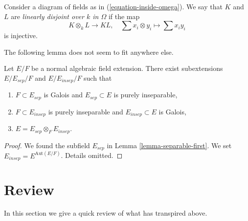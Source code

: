 \begin{definition}
\label{definition-linearly-disjoint}
Consider a diagram of fields as in (\ref{equation-inside-omega}).
We say that $K$ and $L$ are {\it linearly disjoint over $k$ in $\Omega$}
if the map
$$
K \otimes_k L \longrightarrow KL,\quad
\sum x_i \otimes y_i \longmapsto \sum x_i y_i
$$
is injective.
\end{definition}

\noindent
The following lemma does not seem to fit anywhere else.

\begin{lemma}
\label{lemma-normal-case}
Let $E/F$ be a normal algebraic field extension. There exist subextensions
$E / E_{sep} /F$ and $E / E_{insep} / F$ such that
\begin{enumerate}
\item $F \subset E_{sep}$ is Galois and $E_{sep} \subset E$
is purely inseparable,
\item $F \subset E_{insep}$ is purely inseparable and $E_{insep} \subset E$
is Galois,
\item $E = E_{sep} \otimes_F E_{insep}$.
\end{enumerate}
\end{lemma}

\begin{proof}
We found the subfield $E_{sep}$ in Lemma \ref{lemma-separable-first}.
We set $E_{insep} = E^{\text{Aut}(E/F)}$. Details omitted.
\end{proof}









\section{Review}
\label{section-algebraic}

\noindent
In this section we give a quick review of what has transpired above.

